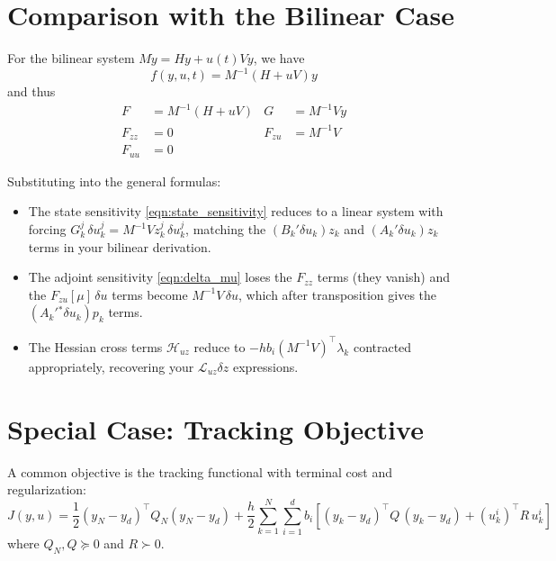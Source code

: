 \documentclass[11pt]{article}
\newcommand{\LL}{\mathcal{L}}
\newcommand{\tp}{^\top}
\newcommand{\inv}{^{-1}}
\begin{document}
\section{Comparison with the Bilinear Case}

For the bilinear system $M\dot{y} = Hy + u(t)Vy$, we have
\begin{equation}
f(y,u,t) = M\inv(H + uV)y
\end{equation}
and thus
\begin{align}
F &= M\inv(H+uV) & G &= M\inv V y \\[4pt]
F_{zz} &= 0 & F_{zu} &= M\inv V \\[4pt]
F_{uu} &= 0
\end{align}

Substituting into the general formulas:
\begin{itemize}
\item The state sensitivity \eqref{eqn:state_sensitivity} reduces to a linear system with forcing $G_k^j\,\delta u_k^j = M\inv V z_k^j\,\delta u_k^j$, matching the $(B_k'\delta u_k)z_k$ and $(A_k'\delta u_k)z_k$ terms in your bilinear derivation.

\item The adjoint sensitivity \eqref{eqn:delta_mu} loses the $F_{zz}$ terms (they vanish) and the $F_{zu}[\mu]\,\delta u$ terms become $M\inv V\,\delta u$, which after transposition gives the $(A_k'{}^\ast \delta u_k)p_k$ terms.

\item The Hessian cross terms $\mathcal{H}_{uz}$ reduce to $-h b_i (M\inv V)\tp \lambda_k$ contracted appropriately, recovering your $\LL_{uz}\delta z$ expressions.
\end{itemize}

\section{Special Case: Tracking Objective}

A common objective is the tracking functional with terminal cost and regularization:
\begin{equation}
J(y,u) = \frac{1}{2}(y_N - y_d)\tp Q_N (y_N-y_d) + \frac{h}{2}\sum_{k=1}^N \sum_{i=1}^d b_i \left[ (y_k-y_d)\tp Q\,(y_k-y_d) + (u_k^i)\tp R\, u_k^i \right]
\end{equation}
where $Q_N, Q \succeq 0$ and $R \succ 0$.
\end{document}
